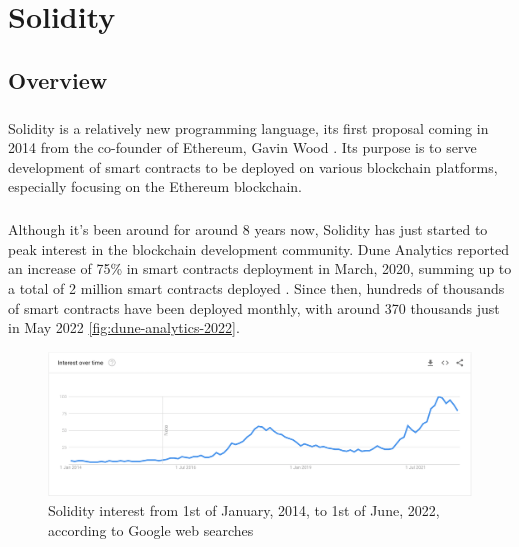 \chapter{Solidity}

\section{Overview}
\paragraph*{}
Solidity is a relatively new programming language, its first proposal coming in 2014 from the co-founder of Ethereum, Gavin Wood \cite{solidity-lang}. Its purpose is to serve development of smart contracts to be deployed on various blockchain platforms, especially focusing on the Ethereum blockchain.

\paragraph*{}
Although it's been around for around 8 years now, Solidity has just started to peak interest in the blockchain development community. Dune Analytics reported an increase of 75\% in smart contracts deployment in March, 2020, summing up to a total of 2 million smart contracts deployed \cite{coin-telegraph-2020}. Since then, hundreds of thousands of smart contracts have been deployed monthly, with around 370 thousands just in May 2022 \ref{fig:dune-analytics-2022}.

\begin{figure}
    \centering
    \includegraphics[width=15cm]{images/solidity_interest.png}
    \caption{Solidity interest from 1st of January, 2014, to 1st of June, 2022, according to Google web searches}
    \label{fig:solidity-interest}
\end{figure}

